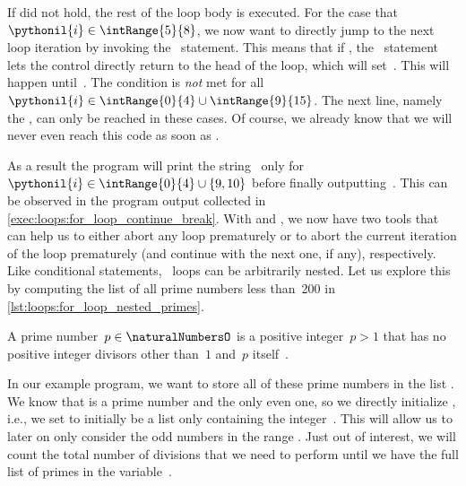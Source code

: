 If  did not hold, the rest of the loop body is executed.
For the case that $\pythonil{i}\in\intRange{5}{8}$, we now want to directly jump to the next loop iteration by invoking the ~statement.
This means that if , the ~statement lets the control directly return to the head of the loop, which will set~.
This will happen until~.
The condition  is \emph{not} met for all $\pythonil{i}\in\intRange{0}{4}\cup\intRange{9}{15}$.
The next line, namely the , can only be reached in these cases.
Of course, we already know that we will never even reach this code as soon as .

As a result the program will print the string~ only for~$\pythonil{i}\in\intRange{0}{4}\cup\{9, 10\}$ before finally outputting~.
This can be observed in the program output collected in \cref{exec:loops:for_loop_continue_break}.
With  and , we now have two tools that can help us to either abort any loop prematurely or to abort the current iteration of the loop prematurely (and continue with the next one, if any), respectively.%
%
\FloatBarrier%
\endhsection%
%
%
%
%
%
Like conditional statements, ~loops can be arbitrarily nested.
Let us explore this by computing the list of all prime numbers less than~200 in \cref{lst:loops:for_loop_nested_primes}.%
%
\begin{definition}%
A prime number~$p\in\naturalNumbersO$ is a positive integer~$p>1$ that has no positive integer divisors other than~$1$ and~$p$ itself~\cite{W2024PN,CP2005PNACP,R1994PNACMFF}.%
\end{definition}%
%
In our example program, we want to store all of these prime numbers in the list .
We know that  is a prime number and the only even one, so we directly initialize , i.e., we set  to initially be a list only containing the integer~.
This will allow us to later on only consider the odd numbers in the range .
Just out of interest, we will count the total number of divisions that we need to perform until we have the full list of primes in the variable~.%
